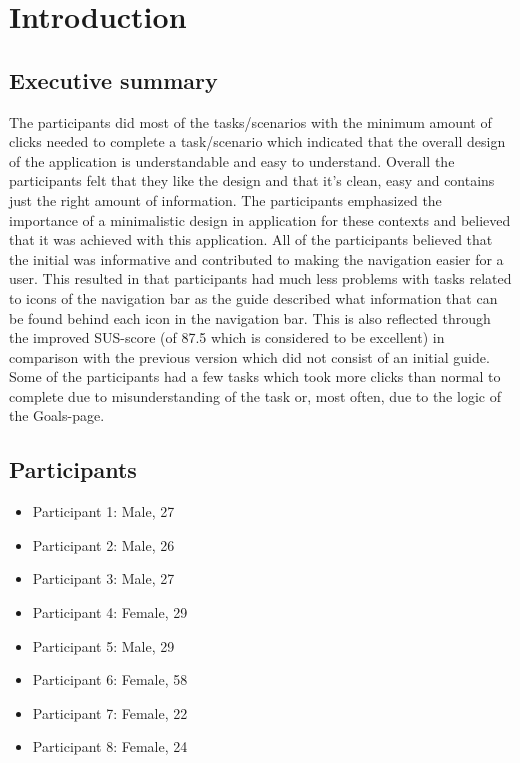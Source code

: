 \chapter{Introduction}

\section{Executive summary}
The participants did most of the tasks/scenarios with the minimum amount of clicks needed to complete a task/scenario which indicated that the overall design of the application is understandable and easy to understand. Overall the participants felt that they like the design and that it's clean, easy and contains just the right amount of information. The participants emphasized the importance of a minimalistic design in application for these contexts and believed that it was achieved with this application. All of the participants believed that the initial was informative and contributed to making the navigation easier for a user. This resulted in that participants had much less problems with tasks related to icons of the navigation bar as the guide described what information that can be found behind each icon in the navigation bar. This is also reflected through the improved SUS-score (of 87.5 which is considered to be excellent) in comparison with the previous version which did not consist of an initial guide. Some of the participants had a few tasks which took more clicks than normal to complete due to misunderstanding of the task or, most often, due to the logic of the Goals-page.

\section{Participants}
\begin{itemize}
    \item Participant 1: Male, 27
    \item Participant 2: Male, 26
    \item Participant 3: Male, 27
    \item Participant 4: Female, 29
    \item Participant 5: Male, 29
    \item Participant 6: Female, 58
    \item Participant 7: Female, 22
    \item Participant 8: Female, 24
\end{itemize}